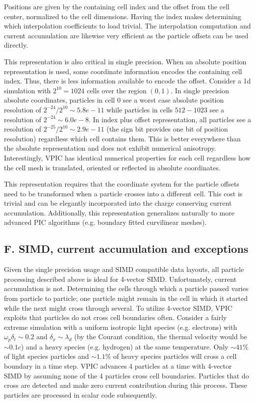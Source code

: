 \documentclass[letter,10pt]{article}
\begin{document}
Positions are given by the containing cell index and the offset from
the cell center, normalized to the cell dimensions.  Having the index
makes determining which interpolation coefficients to load trivial.
The interpolation computation and current accumulation are likewise
very efficient as the particle offsets can be used directly.

This representation is also critical in single precision.  When an
absolute position representation is used, some coordinate information
encodes the containing cell index.  Thus, there is less information
available to encode the offset.  Consider a 1d simulation with $2^{10}
= 1024$ cells over the region $(0,1)$.  In single precision absolute
coordinates, particles in cell $0$ see a worst case absolute position
resolution of $2^{-24}/2^{10} \sim 5.8e-11$ while particles in cells
$512-1023$ see a resolution of $2^{-24} \sim 6.0e-8$.  In index plus
offset representation, all particles see a resolution of
$2^{-25}/2^{10} \sim 2.9e-11$ (the sign bit provides one bit of
position resolution) regardless which cell contains them.  This is
better everywhere than the absolute representation and does not
exhibit numerical anisotropy.  Interestingly, VPIC has identical
numerical properties for each cell regardless how the cell mesh is
translated, oriented or reflected in absolute coordinates.

This representation requires that the coordinate system for the
particle offsets need to be transformed when a particle crosses into a
different cell.  This cost is trivial and can be elegantly
incorporated into the charge conserving current accumulation.
Additionally, this representation generalizes naturally to more
advanced PIC algorithms (e.g. boundary fitted curvilinear meshes).

\subsection{F. SIMD, current accumulation and exceptions}

Given the single precision usage and SIMD compatible data layouts, all
particle processing described above is ideal for 4-vector SIMD.
Unfortunately, current accumulation is not.  Determining the cells
through which a particle passed varies from particle to particle; one
particle might remain in the cell in which it started while the next
might cross through several.  To utilize 4-vector SIMD, VPIC exploits
that particles do not cross cell boundaries often.  Consider a fairly
extreme simulation with a uniform isotropic light species
(e.g. electrons) with $\omega_p \delta_t \sim 0.2$ and $\delta_x \sim
\lambda_d$ (by the Courant condition, the thermal velocity would be
$\sim 0.1c$) and a heavy species (e.g. hydrogen) at the same
temperature.  Only $\sim 41\%$ of light species particles and $\sim
1.1\%$ of heavy species particles will cross a cell boundary in a time
step.  VPIC advances 4 particles at a time with 4-vector SIMD by
assuming none of the 4 particles cross cell boundaries.  Particles
that do cross are detected and make zero current contribution during
this process.  These particles are processed in scalar code
subsequently.
\end{document}
